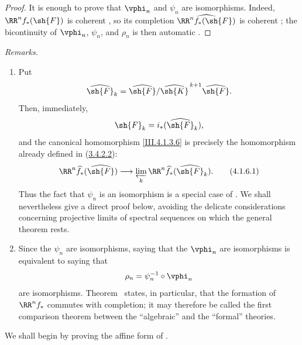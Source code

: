\begin{proof}
It is enough to prove that $\vphi_n$ and $\psi_n$ are isomorphisms.
Indeed, $\RR^n f_*(\sh{F})$ is coherent , so its
completion $\widehat{\RR^n f_*(\sh{F})}$ is coherent
; the bicontinuity of $\vphi_n$, $\psi_n$, and
$\rho_n$ is then automatic .
\end{proof}

\begin{env}[4.1.6]
\label{III.4.1.6}
\emph{Remarks.}
\begin{enumerate}
  \item[(i)] Put
  \[
    \widehat{\sh{F}}_k
    =
    \widehat{\sh{F}}/
    \widehat{\sh{K}}^{\,k+1}\widehat{\sh{F}}.
  \]
  Then, immediately,
  \[
    \sh{F}_k=i_*(\widehat{\sh{F}}_k),
  \]
  and the canonical homomorphism \eqref{III.4.1.3.6} is precisely the
  homomorphism already defined in (\hyperref[III.3.4.2.2]{3.4.2.2}):
  \[
    \RR^n\widehat{f}_*(\widehat{\sh{F}})
    \longrightarrow
    \varprojlim_k
    \RR^n\widehat{f}_*(\widehat{\sh{F}}_k).
    \tag{4.1.6.1}
    \label{III.4.1.6.1}
  \]
  Thus the fact that $\psi_n$ is an isomorphism is a special case of
  .
  We shall nevertheless give a direct proof below, avoiding the
  delicate considerations concerning projective limits of spectral
  sequences  on which the general theorem
   rests.

  \item[(ii)] Since the $\psi_n$ are isomorphisms, saying that the
  $\vphi_n$ are isomorphisms is equivalent to saying that
  \[
    \rho_n=\psi_n^{-1}\circ\vphi_n
  \]
  are isomorphisms.
  Theorem~ states, in particular, that the formation of
  $\RR^n f_*$ commutes with completion; it may therefore be called the
  first comparison theorem between the ``algebraic'' and the
  ``formal'' theories.
\end{enumerate}
We shall begin by proving the affine form of .
\end{env}

